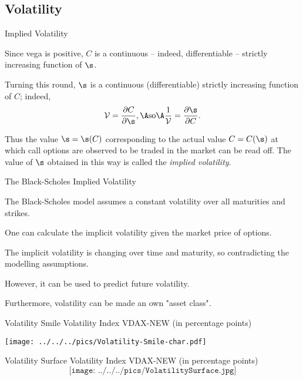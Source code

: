 \subsection{Volatility}

{Implied Volatility}






	
Since vega is positive, $C$ is a continuous -- indeed,
differentiable -- strictly increasing function of $\s$.


	Turning
this round, $\s$ is a continuous (differentiable) strictly
increasing function of $C$; indeed,
$$
{\cal V} = \frac{\partial C}{\partial \s}, \A \mbox{so} \A
\frac{1}{\cal V} = \frac{\partial \s}{\partial C}.
$$


	
Thus the value $\s = \s(C)$ corresponding to the actual value $C =
C(\s)$ at which call options are observed to be traded in the
market can be read off.  The value of $\s$ obtained in this way is
called the {\it implied volatility}.





{The Black-Scholes Implied Volatility}






	The Black-Scholes model assumes a constant volatility over all maturities and strikes.


	One can calculate the implicit volatility given the market price of options.


	The implicit volatility is changing over time and maturity, so contradicting the modelling assumptions.


	However, it can be used to predict future volatility.


	Furthermore, volatility can be made an own "asset class".





{Volatility Smile}
Volatility Index VDAX-NEW (in percentage points)
\begin{center}
\texttt{[image: ../../../pics/Volatility-Smile-char.pdf]}
\end{center}

{Volatility Surface}
Volatility Index VDAX-NEW (in percentage points)
$$\texttt{[image: ../../../pics/VolatilitySurface.jpg]}$$

